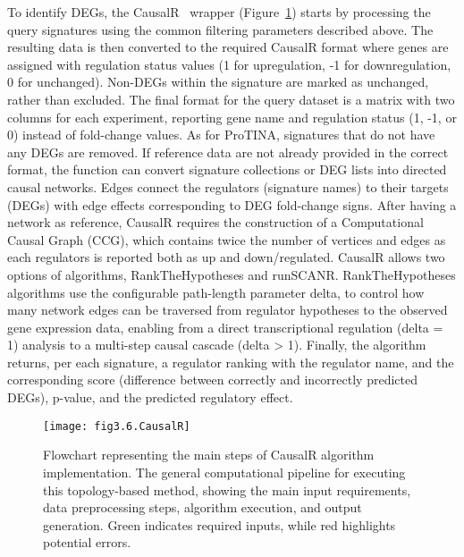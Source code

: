 To identify DEGs, the CausalR~\cite{RN32} wrapper (Figure~\ref{fig:fig3.6.CausalR}) starts by processing the query signatures using the common filtering parameters described above. The resulting data is then converted to the required CausalR format where genes are assigned with regulation status values (1 for upregulation, -1 for downregulation, 0 for unchanged). Non-DEGs within the signature are marked as unchanged, rather than excluded. The final format for the query dataset is a matrix with two columns for each experiment, reporting gene name and regulation status (1, -1, or 0) instead of fold-change values. As for ProTINA, signatures that do not have any DEGs are removed. If reference data are not already provided in the correct format, the function can convert signature collections or DEG lists into directed causal networks. Edges connect the regulators (signature names) to their targets (DEGs) with edge effects corresponding to DEG fold-change signs. 
After having a network as reference, CausalR requires the construction of a Computational Causal Graph (CCG), which contains twice the number of vertices and edges as each regulators is reported both as up and down/regulated. CausalR allows two options of algorithms, RankTheHypotheses and runSCANR. RankTheHypotheses algorithms use the configurable path-length parameter delta, to control how many network edges can be traversed from regulator hypotheses to the observed gene expression data, enabling from a direct transcriptional regulation (delta = 1) analysis to a multi-step causal cascade (delta > 1). Finally, the algorithm returns, per each signature, a regulator ranking with the regulator name, and the corresponding score (difference between correctly and incorrectly predicted DEGs), p-value, and the predicted regulatory effect.

\begin{figure}[htbp]
    \centering
    \texttt{[image: fig3.6.CausalR]}
    \caption{Flowchart representing the main steps of CausalR algorithm implementation. The general computational pipeline for executing this topology-based method, showing the main input requirements, data preprocessing steps, algorithm execution, and output generation. Green indicates required inputs, while red highlights potential errors.}
    \label{fig:fig3.6.CausalR}
\end{figure}


